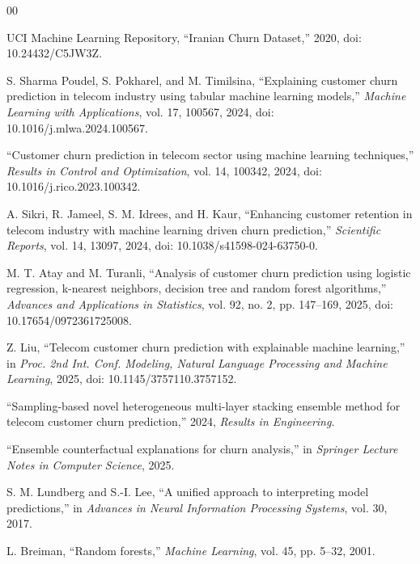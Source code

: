 \documentclass[conference]{IEEEtran}
\begin{document}
\begin{thebibliography}{00}

UCI Machine Learning Repository, ``Iranian Churn Dataset,'' 2020, doi: 10.24432/C5JW3Z.

S. Sharma Poudel, S. Pokharel, and M. Timilsina, ``Explaining customer churn prediction in telecom industry using tabular machine learning models,'' \emph{Machine Learning with Applications}, vol. 17, 100567, 2024, doi: 10.1016/j.mlwa.2024.100567.

``Customer churn prediction in telecom sector using machine learning techniques,'' \emph{Results in Control and Optimization}, vol. 14, 100342, 2024, doi: 10.1016/j.rico.2023.100342.

A. Sikri, R. Jameel, S. M. Idrees, and H. Kaur, ``Enhancing customer retention in telecom industry with machine learning driven churn prediction,'' \emph{Scientific Reports}, vol. 14, 13097, 2024, doi: 10.1038/s41598-024-63750-0.

M. T. Atay and M. Turanli, ``Analysis of customer churn prediction using logistic regression, k-nearest neighbors, decision tree and random forest algorithms,'' \emph{Advances and Applications in Statistics}, vol. 92, no. 2, pp. 147--169, 2025, doi: 10.17654/0972361725008.

Z. Liu, ``Telecom customer churn prediction with explainable machine learning,'' in \emph{Proc. 2nd Int. Conf. Modeling, Natural Language Processing and Machine Learning}, 2025, doi: 10.1145/3757110.3757152.

``Sampling-based novel heterogeneous multi-layer stacking ensemble method for telecom customer churn prediction,'' 2024, \emph{Results in Engineering}.

``Ensemble counterfactual explanations for churn analysis,'' in \emph{Springer Lecture Notes in Computer Science}, 2025.

S. M. Lundberg and S.-I. Lee, ``A unified approach to interpreting model predictions,'' in \emph{Advances in Neural Information Processing Systems}, vol. 30, 2017.

L. Breiman, ``Random forests,'' \emph{Machine Learning}, vol. 45, pp. 5--32, 2001.

\end{thebibliography}
\end{document}
